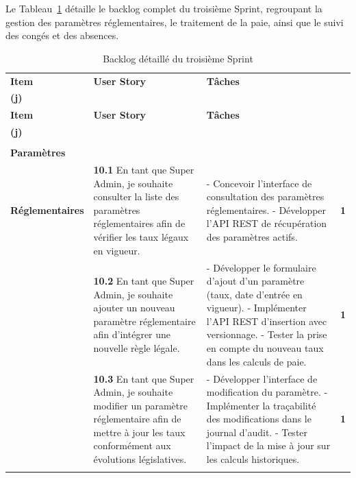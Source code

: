 Le Tableau~\ref{tab:backlog-sprint3} détaille le backlog complet du
troisième Sprint, regroupant la gestion des paramètres réglementaires,
le traitement de la paie, ainsi que le suivi des congés et des absences.

\begin{small}
\renewcommand{\arraystretch}{1.4}
\begin{longtable}{|>{\raggedright\arraybackslash}p{2.8cm}|>{\raggedright\arraybackslash}p{6.2cm}|>{\raggedright\arraybackslash}p{6.2cm}|c|}

\hline
\rowcolor[gray]{0.9} \textbf{Item} & \textbf{User Story} & \textbf{Tâches} & \makecell{\textbf{Est.}\\\textbf{(j)}} \\ \hline
\endfirsthead
\hline
\rowcolor[gray]{0.9} \textbf{Item} & \textbf{User Story} & \textbf{Tâches} & \makecell{\textbf{Est.}\\\textbf{(j)}} \\ \hline
\endhead
\hline
\endfoot
\hline
\caption{Backlog détaillé du troisième Sprint}
\label{tab:backlog-sprint3} 
\endlastfoot

\multirow{4}{*}{\makecell[c]{\textbf{Gestion des}\\ \textbf{Paramètres}\\ \textbf{Réglementaires}}}
& \textbf{10.1} En tant que Super Admin, je souhaite consulter la liste des paramètres réglementaires afin de vérifier les taux légaux en vigueur.
& - Concevoir l'interface de consultation des paramètres réglementaires.\newline
- Développer l'API REST de récupération des paramètres actifs.
& \textbf{1} \\ \cline{2-4}

& \textbf{10.2} En tant que Super Admin, je souhaite ajouter un nouveau paramètre réglementaire afin d'intégrer une nouvelle règle légale.
& - Développer le formulaire d'ajout d'un paramètre (taux, date d'entrée en vigueur).\newline
- Implémenter l'API REST d'insertion avec versionnage.\newline
- Tester la prise en compte du nouveau taux dans les calculs de paie.
& \textbf{1} \\ \cline{2-4}

& \textbf{10.3} En tant que Super Admin, je souhaite modifier un paramètre réglementaire afin de mettre à jour les taux conformément aux évolutions législatives.
& - Développer l'interface de modification du paramètre.\newline
- Implémenter la traçabilité des modifications dans le journal d'audit.\newline
- Tester l'impact de la mise à jour sur les calculs historiques.
& \textbf{1} \\ \cline{2-4}


\end{longtable}
\end{small}
